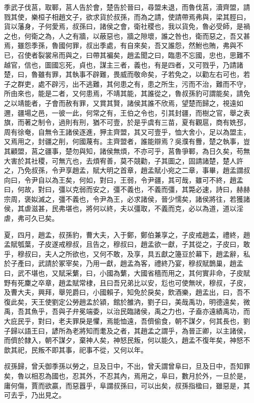 \begin{pinyinscope}
季武子伐莒，取鄆，莒人告於會，楚告於晉曰，尋盟未退，而魯伐莒，瀆齊盟，請戮其使，樂桓子相趙文子，欲求貨於叔孫，而為之請，使請帶焉弗與，梁其脛曰，貨以藩身，子何愛焉，叔孫曰，諸侯之會，衛社稷也，我以貨免，魯必受師，是禍之也，何衛之為，人之有牆，以蔽惡也，牆之隙壞，誰之咎也，衛而惡之，吾又甚焉，雖怨季孫，魯國何罪，叔出季處，有自來矣，吾又誰怨，然鮒也賄，弗與不已，召使者裂裳帛而與之，曰帶其褊矣，趙孟聞之曰，臨患不忘國，忠也，思難不越官，信也，圖國忘死，貞也，謀主三者，義也，有是四者，又可戮乎，乃請諸楚，曰，魯雖有罪，其執事不辟難，畏威而敬命矣，子若免之，以勸左右可也，若子之群吏，處不辟污，出不逃難，其何患之有，患之所生，污而不治，難而不守，所由來也，能是二者，又何患焉，不靖其能，其誰從之，魯叔孫豹可謂能矣，請免之以靖能者，子會而赦有罪，又賞其賢，諸侯其誰不欣焉，望楚而歸之，視遠如邇，疆場之邑，一彼一此，何常之有，王伯之令也，引其封疆，而樹之官，舉之表旗，而著之制令，過則有刑，猶不可壹，於是乎虞有三苗，夏有觀扈，商有姺邳，周有徐奄，自無令王諸侯逐進，狎主齊盟，其又可壹乎，恤大舍小，足以為盟主，又焉用之，封疆之削，何國蔑有。主齊盟者，誰能辯焉？吳濮有釁，楚之執事，豈其顧盟，莒之疆事，楚勿與知，諸侯無煩，不亦可乎，莒魯爭鄆，為日久矣，苟無大害於其社稷，可無亢也，去煩宥善，莫不競勸，子其圖之，固請諸楚，楚人許之，乃免叔孫，令尹享趙孟，賦大明之首章，趙孟賦小宛之二章，事畢，趙孟謂叔向曰，令尹自以為王矣，何如，對曰，王弱，令尹疆，其可哉，雖可不終，趙孟曰，何故，對曰，彊以克弱而安之，彊不義也，不義而彊，其斃必速，詩曰，赫赫宗周，褒姒滅之，彊不義也，令尹為王，必求諸侯，晉少懦矣，諸侯將往，若獲諸侯，其虐滋甚，民弗堪也，將何以終，夫以彊取，不義而克，必以為道，道以淫虐，弗可久已矣。

夏，四月，趙孟，叔孫豹，曹大夫，入于鄭，鄭伯兼享之，子皮戒趙孟，禮終，趙孟賦瓠葉，子皮遂戒穆叔，且告之，穆叔曰，趙孟欲一獻，子其從之，子皮曰，敢乎，穆叔曰，夫人之所欲也，又何不敢，及享，具五獻之籩豆於幕下，趙孟辭，私於子產曰，武請於冢宰矣，乃用一獻，趙孟為客，禮終乃宴，穆叔賦鵲巢，趙孟曰，武不堪也，又賦采蘩，曰，小國為蘩，大國省穡而用之，其何實非命，子皮賦野有死麇之卒章，趙孟賦常棣，且曰吾兄弟比以安，尨也可使無吠，穆叔，子皮，及曹大夫，興拜，舉兕爵曰，小國賴子，知免於戾矣，飲酒樂，趙孟出，曰，吾不復此矣，天王使劉定公勞趙孟於潁，館於雒汭，劉子曰，美哉禹功，明德遠矣，微禹，吾其魚乎，吾與子弁冕端委，以治民臨諸侯，禹之力也，子盍亦遠績禹功，而大庇民乎，對曰，老夫罪戾是懼，焉能恤遠，吾儕偷食，朝不謀夕，何其長也，劉子歸以語王曰，諺所為老將知而耄及之者，其趙孟之謂乎，為晉正卿，以主諸侯，而儕於隸入，朝不謀夕，棄神人矣，神怒民叛，何以能久，趙孟不復年矣，神怒不歆其祀，民叛不即其事，祀事不從，又何以年。

叔孫歸，曾夭御季孫以勞之，旦及日中，不出，曾夭謂曾阜曰，旦及日中，吾知罪矣，魯以相忍為國也，忍其外，不忍其內，焉用之，阜曰，數月於外，一旦於是，庸何傷，賈而欲贏，而惡囂乎，阜謂叔孫曰，可以出矣，叔孫指楹曰，雖惡是，其可去乎，乃出見之。


\end{pinyinscope}
